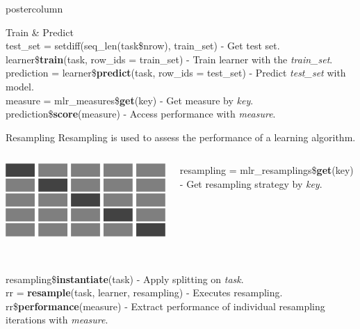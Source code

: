 \documentclass{beamer}
\begin{document}
\begin{frame}[fragile]{}
\begin{columns}
\begin{column}{.31\textwidth}
\begin{beamercolorbox}[center]{postercolumn}
\begin{minipage}{.98\textwidth}
{\begin{myblock}{Train \& Predict}
						\\[\baselineskip]
						test\_set = setdiff(seq\_len(task\$nrow), train\_set) - Get test set.
						\\[\baselineskip]
						learner\$\textbf{train}(task, row\_ids = train\_set) - Train learner with the \textit{train\_set}.
						\\[\baselineskip]
						prediction = learner\$\textbf{predict}(task, row\_ids = test\_set) - Predict \textit{test\_set} with model.
						\\[\baselineskip]
						measure = mlr\_measures\$\textbf{get}(key) - Get measure by \textit{key}.
						\\[\baselineskip]
						prediction\$\textbf{score}(measure) - Access performance with \textit{measure}.
					\end{myblock}
					\begin{myblock}{Resampling}
						Resampling is used to assess the performance of a learning algorithm.
						\\[2\baselineskip]
						\begin{minipage}{\textwidth}
							\begin{columns}[T]
								\begin{column}{0.2\textwidth}
									\includegraphics[width=\textwidth]{img/cross_validation.png}
								\end{column}
								\begin{column}{0.8\textwidth}
										resampling = mlr\_resamplings\$\textbf{get}(key) - Get resampling strategy by \textit{key}. 
								\end{column}
							\end{columns}
						\end{minipage}
						\\[\baselineskip]
						resampling\$\textbf{instantiate}(task) - Apply splitting on \textit{task}.
						\\[\baselineskip]
						rr = \textbf{resample}(task, learner, resampling) - Executes resampling.
						\\[\baselineskip]
						rr\$\textbf{performance}(measure) - Extract performance of individual resampling iterations with \textit{measure}.
						

\end{myblock}}
\end{minipage}
\end{beamercolorbox}
\end{column}
\end{columns}
\end{frame}
\end{document}
